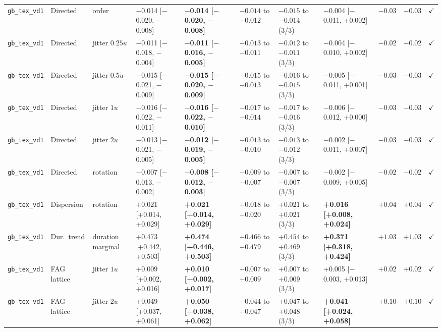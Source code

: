 \begin{longtable}{lllllllllrc}
\texttt{gb\_tex\_vd1} & Directed & order & $-$0.014 [$-$0.020, $-$0.008] & \textbf{$-$0.014 [$-$0.020, $-$0.008]} & $-0.014$ to $-0.012$ & $-0.015$ to $-0.014$ (3/3) & $-$0.004 [$-$0.011, +0.002] & $-0.03$ & $-0.03$ & $\checkmark$ \\
\texttt{gb\_tex\_vd1} & Directed & jitter $0.25u$ & $-$0.011 [$-$0.018, $-$0.004] & \textbf{$-$0.011 [$-$0.016, $-$0.005]} & $-0.013$ to $-0.011$ & $-0.012$ to $-0.011$ (3/3) & $-$0.004 [$-$0.010, +0.002] & $-0.02$ & $-0.02$ & $\checkmark$ \\
\texttt{gb\_tex\_vd1} & Directed & jitter $0.5u$ & $-$0.015 [$-$0.021, $-$0.009] & \textbf{$-$0.015 [$-$0.020, $-$0.009]} & $-0.015$ to $-0.013$ & $-0.016$ to $-0.015$ (3/3) & $-$0.005 [$-$0.011, +0.001] & $-0.03$ & $-0.03$ & $\checkmark$ \\
\texttt{gb\_tex\_vd1} & Directed & jitter $1u$ & $-$0.016 [$-$0.022, $-$0.011] & \textbf{$-$0.016 [$-$0.022, $-$0.010]} & $-0.017$ to $-0.014$ & $-0.017$ to $-0.016$ (3/3) & $-$0.006 [$-$0.012, +0.000] & $-0.03$ & $-0.03$ & $\checkmark$ \\
\texttt{gb\_tex\_vd1} & Directed & jitter $2u$ & $-$0.013 [$-$0.021, $-$0.005] & \textbf{$-$0.012 [$-$0.019, $-$0.005]} & $-0.013$ to $-0.010$ & $-0.013$ to $-0.012$ (3/3) & $-$0.002 [$-$0.011, +0.007] & $-0.03$ & $-0.03$ & $\checkmark$ \\
\texttt{gb\_tex\_vd1} & Directed & rotation & $-$0.007 [$-$0.013, $-$0.002] & \textbf{$-$0.008 [$-$0.012, $-$0.003]} & $-0.009$ to $-0.007$ & $-0.007$ to $-0.007$ (3/3) & $-$0.002 [$-$0.009, +0.005] & $-0.02$ & $-0.02$ & $\checkmark$ \\
\texttt{gb\_tex\_vd1} & Dispersion & rotation & +0.021 [+0.014, +0.029] & \textbf{+0.021 [+0.014, +0.029]} & $+0.018$ to $+0.020$ & $+0.021$ to $+0.021$ (3/3) & \textbf{+0.016 [+0.008, +0.024]} & $+0.04$ & $+0.04$ & $\checkmark$ \\
\texttt{gb\_tex\_vd1} & Dur.\ trend & duration marginal & +0.473 [+0.442, +0.503] & \textbf{+0.474 [+0.446, +0.503]} & $+0.466$ to $+0.479$ & $+0.454$ to $+0.469$ (3/3) & \textbf{+0.371 [+0.318, +0.424]} & $+1.03$ & $+1.03$ & $\checkmark$ \\
\texttt{gb\_tex\_vd1} & FAG lattice & jitter $1u$ & +0.009 [+0.002, +0.016] & \textbf{+0.010 [+0.002, +0.017]} & $+0.007$ to $+0.009$ & $+0.007$ to $+0.009$ (3/3) & +0.005 [$-$0.003, +0.013] & $+0.02$ & $+0.02$ & $\checkmark$ \\
\texttt{gb\_tex\_vd1} & FAG lattice & jitter $2u$ & +0.049 [+0.037, +0.061] & \textbf{+0.050 [+0.038, +0.062]} & $+0.044$ to $+0.047$ & $+0.047$ to $+0.048$ (3/3) & \textbf{+0.041 [+0.024, +0.058]} & $+0.10$ & $+0.10$ & $\checkmark$ \\

\end{longtable}
